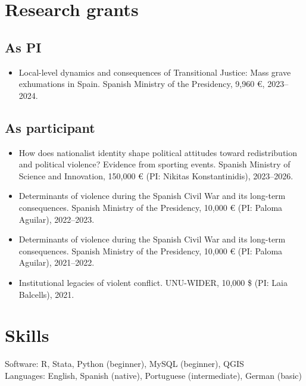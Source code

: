 \documentclass[a4paper, 12pt]{article}
\begin{document}
\section*{Research grants}

\subsection*{As PI}

\begin{itemize}[leftmargin=12pt, itemsep=0pt]
  \item Local-level dynamics and consequences of Transitional Justice: Mass grave exhumations in Spain. Spanish Ministry of the Presidency, 9,960 €, 2023--2024. %
\end{itemize}

\subsection*{As participant}

\begin{itemize}[leftmargin=12pt, itemsep=0pt]
	\item How does nationalist identity shape political attitudes toward redistribution and political violence? Evidence from sporting events. Spanish Ministry of Science and Innovation, 150,000 € (PI: Nikitas Konstantinidis), 2023--2026. %
	\item Determinants of violence during the Spanish Civil War and its long-term consequences. Spanish Ministry of the Presidency, 10,000 € (PI: Paloma Aguilar), 2022--2023. %
	\item Determinants of violence during the Spanish Civil War and its long-term consequences. Spanish Ministry of the Presidency, 10,000 € (PI: Paloma Aguilar), 2021--2022. %
	\item Institutional legacies of violent conflict. UNU-WIDER, 10,000 \$ (PI: Laia Balcells), 2021.
\end{itemize}


\section*{Skills}

Software: R, Stata, Python (beginner), MySQL (beginner), QGIS\\
Languages: English, Spanish (native), Portuguese (intermediate), German (basic)
\end{document}
